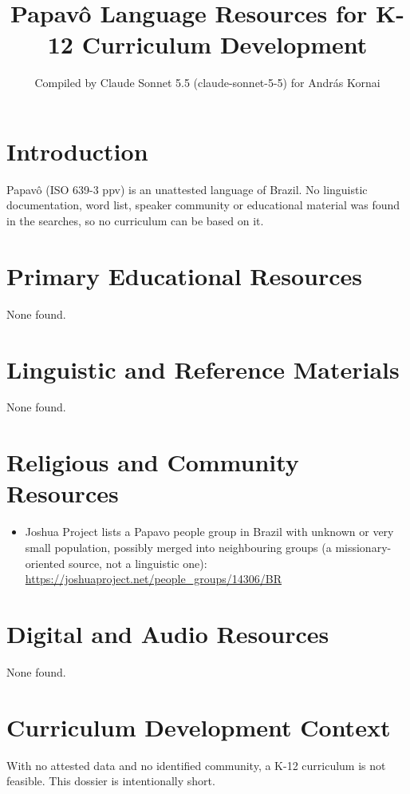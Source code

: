 \documentclass[12pt]{article}
\title{Papavô Language Resources for K-12 Curriculum Development}
\author{Compiled by Claude Sonnet 5.5 (claude-sonnet-5-5) for Andr\'as Kornai}
\date{}
\begin{document}
\maketitle
\section{Introduction}
Papavô (ISO 639-3 ppv) is an unattested language of Brazil. No linguistic documentation, word list, speaker community or educational material was found in the searches, so no curriculum can be based on it.
\section{Primary Educational Resources}
None found.
\section{Linguistic and Reference Materials}
None found.
\section{Religious and Community Resources}
\begin{itemize}
\item Joshua Project lists a Papavo people group in Brazil with unknown or very small population, possibly merged into neighbouring groups (a missionary-oriented source, not a linguistic one): \url{https://joshuaproject.net/people_groups/14306/BR}
\end{itemize}
\section{Digital and Audio Resources}
None found.
\section{Curriculum Development Context}
With no attested data and no identified community, a K-12 curriculum is not feasible. This dossier is intentionally short.
\end{document}
